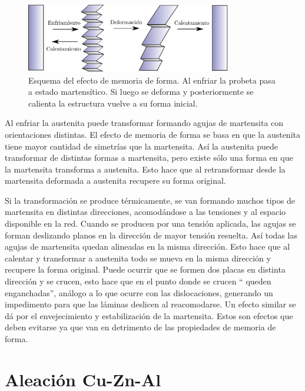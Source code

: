 \documentclass[a4paper,12pt,fleqn,twoside,openany]{book}
\begin{document}
\begin{figure}[h]
 \centering
 \includegraphics[width=0.8\textwidth]{memoria.eps}
 \caption{Esquema del efecto de memoria de forma. Al enfriar la probeta pasa a estado martensítico. Si luego se deforma y posteriormente se calienta
 la estructura vuelve a su forma inicial.} 
 \label{fig:memoria}
 \end{figure}

Al enfriar la austenita puede transformar formando agujas de martensita con orientaciones distintas. El efecto de memoria de forma se basa en que la 
austenita tiene mayor cantidad de simetrías que la martensita. Así la austenita puede transformar de distintas formas a martensita, pero existe sólo 
una forma en que la martensita transforma a austenita. Esto hace que al retransformar desde la martensita deformada a austenita recupere su forma 
original.

Si la transformación se produce térmicamente, se van formando muchos tipos de martensita en distintas 
direcciones, acomodándose a las tensiones y al espacio disponible en la red. Cuando se producen por una tensión aplicada, las agujas se forman deslizando
planos en la dirección de mayor tensión resuelta. Así todas las agujas de martensita quedan alineadas en la misma dirección. Esto hace que al calentar y 
transformar a austenita todo se mueva en la misma dirección y recupere la forma original. Puede ocurrir que se formen dos placas en distinta dirección 
y se crucen, esto hace que en el punto donde se crucen “ queden enganchadas”, análogo a lo que ocurre con las dislocaciones, generando un impedimento 
para que las láminas deslicen al reacomodarse. Un efecto similar se dá por el envejecimiento y estabilización de la martensita. Estos son efectos que 
deben evitarse ya que van en detrimento de las propiedades de memoria de forma.


\section{Aleación Cu-Zn-Al}
\end{document}
